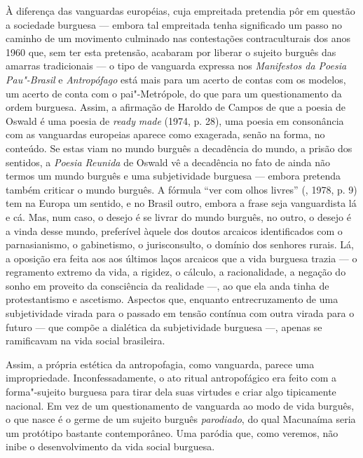 À diferença das vanguardas européias, cuja empreitada pretendia pôr em
questão a sociedade burguesa --- embora tal empreitada tenha significado
um passo no caminho de um movimento culminado nas contestações
contraculturais dos anos 1960 que, sem ter esta pretensão, acabaram por
liberar o sujeito burguês das amarras tradicionais --- o tipo de
vanguarda expressa nos \emph{Manifestos da Poesia Pau"-Brasil} e
\emph{Antropófago} está mais para um acerto de contas com os modelos, um
acerto de conta com o pai"-Metrópole, do que para um questionamento da
ordem burguesa. Assim, a afirmação de Haroldo de Campos de que a poesia
de Oswald é uma poesia de \emph{ready} \emph{made} (1974, p. 28), uma
poesia em consonância com as vanguardas europeias aparece como
exagerada, senão na forma, no conteúdo. Se estas viam no mundo burguês a
decadência do mundo, a prisão dos sentidos, a \emph{Poesia Reunida} de
Oswald vê a decadência no fato de ainda não termos um mundo burguês e
uma subjetividade burguesa --- embora pretenda também criticar o mundo
burguês. A fórmula ``ver com olhos livres'' (, 1978, p. 9)
tem na Europa um sentido, e no Brasil outro, embora a frase seja
vanguardista lá e cá. Mas, num caso, o desejo é se livrar do mundo
burguês, no outro, o desejo é a vinda desse mundo, preferível àquele dos
doutos arcaicos identificados com o parnasianismo, o gabinetismo, o
jurisconsulto, o domínio dos senhores rurais. Lá, a oposição era feita
aos aos últimos laços arcaicos que a vida burguesa trazia --- o
regramento extremo da vida, a rigidez, o cálculo, a racionalidade, a
negação do sonho em proveito da consciência da realidade ---, ao que ela
anda tinha de protestantismo e ascetismo. Aspectos que, enquanto
entrecruzamento de uma subjetividade virada para o passado em tensão
contínua com outra virada para o futuro --- que compõe a dialética da
subjetividade burguesa ---, apenas se ramificavam na vida social
brasileira.

Assim, a própria estética da antropofagia, como vanguarda, parece uma
impropriedade. Inconfessadamente, o ato ritual antropofágico era feito
com a forma"-sujeito burguesa para tirar dela suas virtudes e criar algo
tipicamente nacional. Em vez de um questionamento de vanguarda ao modo
de vida burguês, o que nasce é o germe de um sujeito burguês
\emph{parodiado}, do qual Macunaíma seria um protótipo bastante
contemporâneo. Uma paródia que, como veremos, não inibe o
desenvolvimento da vida social burguesa.

